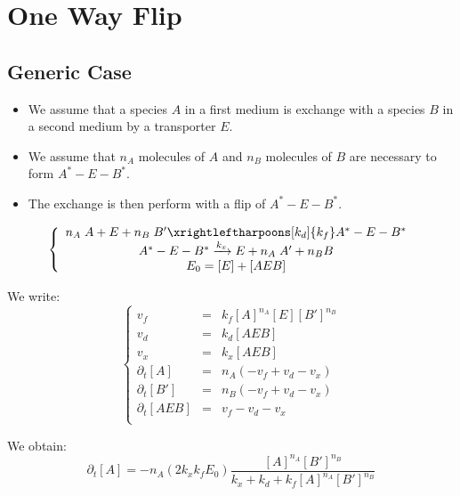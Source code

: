 \documentclass[aps,12pt]{revtex4}
\begin{document}
\newpage

\section{One Way Flip}

\subsection{Generic Case}

\begin{itemize}
\item We assume that a species $A$ in a first medium is exchange with a species $B$ in a second medium by a transporter $E$.
\item We assume that $n_A$ molecules of $A$   and $n_B$ molecules of $B$
are necessary to form $A^\ast-E-B^\ast$.
\item The exchange is then perform with a flip of $A^\ast-E-B^\ast$.
\end{itemize}

\begin{equation}
\left\lbrace
\begin{array}{c}
n_A\;A + E + n_B\;B' \xrightleftharpoons[k_d]{k_f} A^\ast-E-B^\ast \\
A^\ast-E-B^\ast \xrightarrow[]{k_x} E + n_A\;A' + n_B B\\
E_0 = [E] + [AEB]\\
\end{array}
\right.
\end{equation}

We write:
\begin{equation}
\left\lbrace
\begin{array}{ccl}
v_f & = & k_f [A]^{n_A} [E] [B']^{n_B} \\
v_d & = & k_d [AEB] \\
v_x & = & k_x [AEB] \\
\partial_t [A]   & = & n_A  (-v_f + v_d - v_x)\\
\partial_t [B']  & = & n_B  (-v_f + v_d - v_x)\\
\partial_t [AEB] & = & v_f - v_d - v_x\\
\end{array}
\right.
\end{equation}

We obtain:
\begin{equation}
\partial_t [A] = -  n_A  (2k_x k_f E_0) \dfrac{[A]^{n_A} [B']^{n_B}}{k_x + k_d + k_f [A]^{n_A} [B']^{n_B}}
\end{equation}
\end{document}
